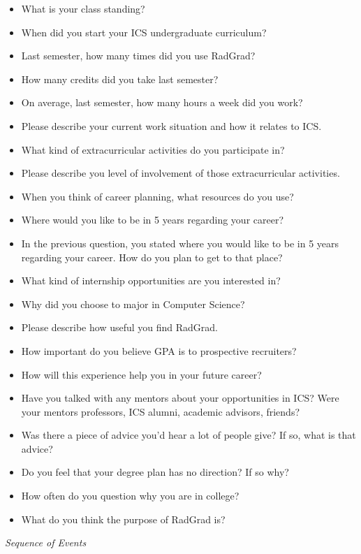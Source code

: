 \documentclass[english]{proposalnsf}
\begin{document}
\begin{itemize}
	\item What is your class standing?
	\item When did you start your ICS undergraduate curriculum?
	\item Last semester, how many times did you use RadGrad? 
	\item How many credits did you take last semester?
	\item On average, last semester, how many hours a week did you work?	
	\item Please describe your current work situation and how it relates to ICS.
	\item What kind of extracurricular activities do you participate in?
	\item Please describe you level of involvement of those extracurricular activities.
	\item When you think of career planning, what resources do you use?
	\item Where would you like to be in 5 years regarding your career?
	\item In the previous question, you stated where you would like to be in 5 years regarding your career. How do you plan to get to that place?
	\item What kind of internship opportunities are you interested in?
	\item Why did you choose to major in Computer Science?
	\item Please describe how useful you find RadGrad.
	\item How important do you believe GPA is to prospective recruiters?
	\item How will this experience help you in your future career?
	\item Have you talked with any mentors about your opportunities in ICS? Were your mentors professors, ICS alumni, academic advisors, friends?
	\item Was there a piece of advice you'd hear a lot of people give? If so, what is that advice?
	\item Do you feel that your degree plan has no direction? If so why?
	\item How often do you question why you are in college?
	\item What do you think the purpose of RadGrad is?

\end{itemize} 

{\em Sequence of Events}
\end{document}
